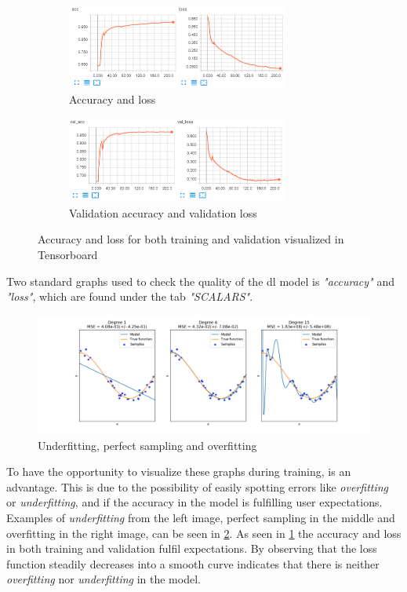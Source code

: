 \documentclass[USenglish]{ifimaster}  %
\begin{document}
\begin{figure}[H]
\centering
\begin{subfigure}[b]{\textwidth}
\centering
\includegraphics[width=0.8\textwidth]{bilder/tensorboard_acc.png}
\caption{Accuracy and loss}
\end{subfigure}
\hfill
\begin{subfigure}[b]{\textwidth}
\centering
\includegraphics[width=0.8\textwidth]{bilder/tensorboard_val_acc.png}
\caption{Validation accuracy and validation loss}
\end{subfigure}
\caption{Accuracy and loss for both training and validation visualized in Tensorboard}
\label{fig:accuracy_loss}
\end{figure}
Two standard graphs used to check the quality of the \ac{dl} model is \textit{"accuracy"} and \textit{"loss"}, which are found under the tab \textit{"SCALARS"}. 
\begin{figure}[ht]
    \centering
    \includegraphics[width=1\textwidth]{bilder/overfitting_underfitting.png}
    \caption{Underfitting, perfect sampling and overfitting \cite{website:overfitting_underfitting}}
    \label{fig:overfitting_underfitting}
\end{figure}
To have the opportunity to visualize these graphs during training, is an advantage. This is due to the possibility of easily spotting errors like \textit{overfitting} or \textit{underfitting}, and if the accuracy in the model is fulfilling user expectations. Examples of \textit{underfitting} from the left image, perfect sampling in the middle and overfitting in the right image, can be seen in \cref{fig:overfitting_underfitting}. As seen in \cref{fig:accuracy_loss} the accuracy and loss in both training and validation fulfil expectations. 
By observing that the loss function steadily decreases into a smooth curve indicates that there is neither \textit{overfitting} nor \textit{underfitting} in the model.
\end{document}
